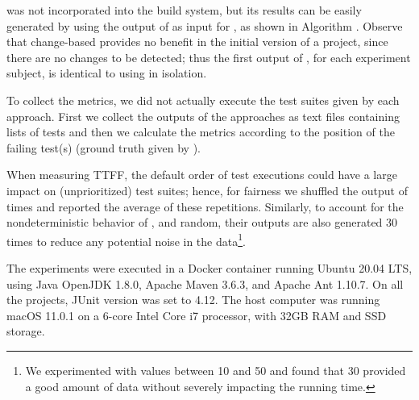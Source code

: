 \fz was not incorporated into the build system, but its results can be easily generated by using the output of \ek as input for \fz, as shown in Algorithm .
Observe that change-based \tcs provides no benefit in the initial version of a project, since there are no changes to be detected; thus the first output of \fz, for each experiment subject, is identical to using \fs in isolation.

To collect the metrics, we did not actually execute the test suites given by each approach. First we collect the outputs of the approaches as text files containing lists of tests and then we calculate the metrics according to the position of the failing test(s) (ground truth given by \dfj).

When measuring TTFF, the default order of test executions could have a large impact on (unprioritized) test suites; hence, for fairness we shuffled the output of  times and reported the average of these repetitions.
Similarly, to account for the nondeterministic behavior of \fs, \fz and random, their outputs are also generated 30 times to reduce any potential noise in the data\footnote{We experimented with values between 10 and 50 and found that 30 provided a good amount of data without severely impacting the running time.}.

The experiments were executed in a Docker container running Ubuntu 20.04 LTS, using Java OpenJDK 1.8.0, Apache Maven 3.6.3, and Apache Ant 1.10.7.
On all the projects, JUnit version was set to 4.12.
The host computer was running macOS 11.0.1 on a 6-core Intel Core i7 processor, with 32GB RAM and SSD storage.

